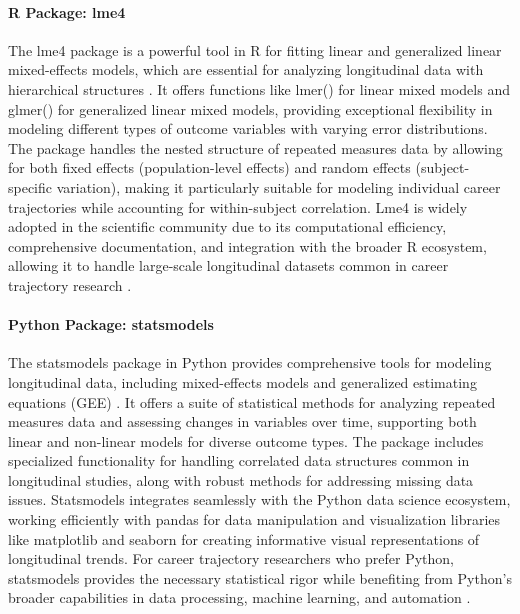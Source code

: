\documentclass[../main.tex]{subfiles}
\begin{document}

\paragraph{R Package: lme4}
The lme4 package is a powerful tool in R for fitting linear and generalized linear mixed-effects models, which are essential for analyzing longitudinal data with hierarchical structures \cite{lme4slides2011}. It offers functions like lmer() for linear mixed models and glmer() for generalized linear mixed models, providing exceptional flexibility in modeling different types of outcome variables with varying error distributions. The package handles the nested structure of repeated measures data by allowing for both fixed effects (population-level effects) and random effects (subject-specific variation), making it particularly suitable for modeling individual career trajectories while accounting for within-subject correlation. Lme4 is widely adopted in the scientific community due to its computational efficiency, comprehensive documentation, and integration with the broader R ecosystem, allowing it to handle large-scale longitudinal datasets common in career trajectory research \cite{lme4slides2011}.

\paragraph{Python Package: statsmodels}
The statsmodels package in Python provides comprehensive tools for modeling longitudinal data, including mixed-effects models and generalized estimating equations (GEE) \cite{statsmodels2024}. It offers a suite of statistical methods for analyzing repeated measures data and assessing changes in variables over time, supporting both linear and non-linear models for diverse outcome types. The package includes specialized functionality for handling correlated data structures common in longitudinal studies, along with robust methods for addressing missing data issues. Statsmodels integrates seamlessly with the Python data science ecosystem, working efficiently with pandas for data manipulation and visualization libraries like matplotlib and seaborn for creating informative visual representations of longitudinal trends. For career trajectory researchers who prefer Python, statsmodels provides the necessary statistical rigor while benefiting from Python's broader capabilities in data processing, machine learning, and automation \cite{statsmodels2024}.
\end{document}
